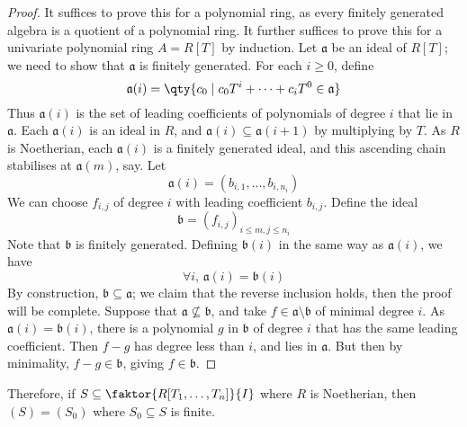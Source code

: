 \begin{proof}
    It suffices to prove this for a polynomial ring, as every finitely generated algebra is a quotient of a polynomial ring.
    It further suffices to prove this for a univariate polynomial ring \( A = R[T] \) by induction.
    Let \( \mathfrak a \) be an ideal of \( R[T] \); we need to show that \( \mathfrak a \) is finitely generated.
    For each \( i \geq 0 \), define
    \[ \mathfrak a(i) = \qty{c_0 \mid c_0 T^i + \dots + c_i T^0 \in \mathfrak a} \]
    Thus \( \mathfrak a(i) \) is the set of leading coefficients of polynomials of degree \( i \) that lie in \( \mathfrak a \).
    Each \( \mathfrak a(i) \) is an ideal in \( R \), and \( \mathfrak a(i) \subseteq \mathfrak a(i+1) \) by multiplying by \( T \).
    As \( R \) is Noetherian, each \( \mathfrak a(i) \) is a finitely generated ideal, and this ascending chain stabilises at \( \mathfrak a(m) \), say.
    Let
    \[ \mathfrak a(i) = (b_{i,1}, \dots, b_{i,n_i}) \]
    We can choose \( f_{i,j} \) of degree \( i \) with leading coefficient \( b_{i,j} \).
    Define the ideal
    \[ \mathfrak b = (f_{i,j})_{i \leq m, j \leq n_i} \]
    Note that \( \mathfrak b \) is finitely generated.
    Defining \( \mathfrak b(i) \) in the same way as \( \mathfrak a(i) \), we have
    \[ \forall i,\, \mathfrak a(i) = \mathfrak b(i) \]
    By construction, \( \mathfrak b \subseteq \mathfrak a \); we claim that the reverse inclusion holds, then the proof will be complete.
    Suppose that \( \mathfrak a \nsubseteq \mathfrak b \), and take \( f \in \mathfrak a \setminus \mathfrak b \) of minimal degree \( i \).
    As \( \mathfrak a(i) = \mathfrak b(i) \), there is a polynomial \( g \) in \( \mathfrak b \) of degree \( i \) that has the same leading coefficient.
    Then \( f - g \) has degree less than \( i \), and lies in \( \mathfrak a \).
    But then by minimality, \( f - g \in \mathfrak b \), giving \( f \in \mathfrak b \).
\end{proof}
Therefore, if \( S \subseteq \faktor{R[T_1, \dots, T_n]}{I} \) where \( R \) is Noetherian, then \( (S) = (S_0) \) where \( S_0 \subseteq S \) is finite.
